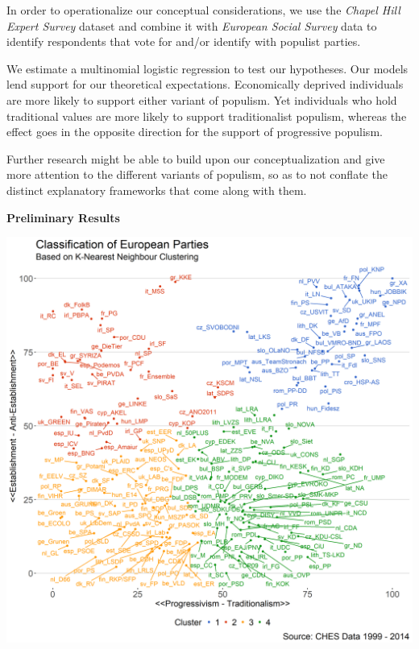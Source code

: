 \documentclass[]{article}
\begin{document}
In order to operationalize our conceptual considerations, we use the
\emph{Chapel Hill Expert Survey} dataset and combine it with
\emph{European Social Survey} data to identify respondents that vote for
and/or identify with populist parties.

We estimate a multinomial logistic regression to test our hypotheses.
Our models lend support for our theoretical expectations. Economically
deprived individuals are more likely to support either variant of
populism. Yet individuals who hold traditional values are more likely to
support traditionalist populism, whereas the effect goes in the opposite
direction for the support of progressive populism.

Further research might be able to build upon our conceptualization and
give more attention to the different variants of populism, so as to not
conflate the distinct explanatory frameworks that come along with them.

\newpage

\begin{center}
{\LARGE \textbf{Preliminary Results}}
\end{center}

\vspace{0.2cm}

\begin{center}\includegraphics[height=0.55\textheight]{images/party_alignment_abstract} \end{center}
\end{document}
